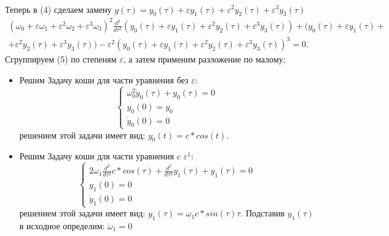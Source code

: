 \documentclass[12pt]{article}
\begin{document}
\begin{itemize}
\begin{eqnarray}
        \end{eqnarray}
        Теперь в (4) сделаем замену $y(\tau)=y_0(\tau)+\varepsilon y_1(\tau)+\varepsilon^2y_2(\tau)+\varepsilon^3y_3(\tau)$
        \begin{eqnarray}
            (\omega_0+\varepsilon\omega_1+\varepsilon^2\omega_2+\varepsilon^3\omega_3)^2\frac{d^2}{d\tau^2}(y_0(\tau)
            +\varepsilon y_1(\tau)+\varepsilon^2y_2(\tau)+\varepsilon^3y_3(\tau))+(y_0(\tau)+\varepsilon y_1(\tau)+\nonumber\\
            +\varepsilon^2y_2(\tau)+\varepsilon^3y_3(\tau))-\varepsilon^2(y_0(\tau)+\varepsilon y_1(\tau)+\varepsilon^2y_2(\tau)
            +\varepsilon^3y_3(\tau))^3=0.
        \end{eqnarray}
        \newpage
        Сгруппируем (5) по степеням $\varepsilon$, а затем применим разложение по малому:
        \begin{itemize}
            \item Решим Задачу коши для части уравнения без $\varepsilon$:
            \begin{equation*}
                \begin{cases}
                    \omega_0^2\ddot y_0(\tau)+y_0(\tau)=0 \\
                    y_0(0)=y_0\\
                    \dot y_0(0)=0
                \end{cases}
            \end{equation*}
            решением этой задачи имеет вид: $y_0(t)=c*cos(t)$.
            
            \item Решим Задачу коши для части уравнения c $\varepsilon^1$:
            \begin{equation*}
                \begin{cases}
                    2\omega_1\frac{d^2}{d\tau^2}c*cos(\tau) + \frac{d^2}{d\tau^2}y_1(\tau) + y_1(\tau)=0 \\
                    y_1(0)=0\\
                    \dot y_1(0)=0
                \end{cases}
            \end{equation*}
            решением этой задачи имеет вид: $y_1(\tau) = \omega_1c*sin(\tau)\tau$. Подставив $y_1(\tau)$ в исходное определим:
            $\omega_1=0$


\end{itemize}
\end{itemize}
\end{document}
